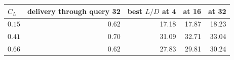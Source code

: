 \begin{tabular}{lrrrr}
\toprule
$C_L$ & delivery through query 32 & best $L/D$ at 4 & at 16 & at 32 \\
\midrule
$0.15$ & 0.62 & 17.18 & 17.87 & 18.23 \\
$0.41$ & 0.70 & 31.09 & 32.71 & 33.04 \\
$0.66$ & 0.62 & 27.83 & 29.81 & 30.24 \\
\bottomrule
\end{tabular}
